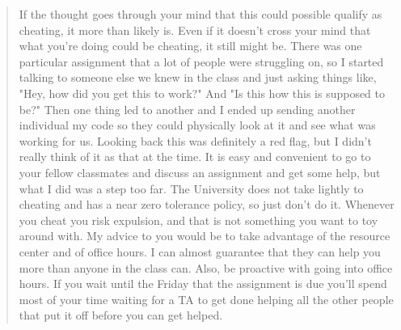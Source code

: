 \documentclass[12pt]{scrartcl}
\begin{document}
\begin{quote}
If the thought goes through your mind that this could possible qualify as
cheating, it more than likely is. Even if it doesn't cross your mind that
what you're doing could be cheating, it still might be. There was one
particular assignment that a lot of people were struggling on, so I started
talking to someone else we knew in the class and just asking things like,
"Hey, how did you get this to work?" And "Is this how this is supposed to
be?" Then one thing led to another and I ended up sending another individual
my code so they could physically look at it and see what was working for us.
Looking back this was definitely a red flag, but I didn't really think of
it as that at the time. It is easy and convenient to go to your fellow
classmates and discuss an assignment and get some help, but what I did
was a step too far. The University does not take lightly to cheating and
has a near zero tolerance policy, so just don't do it. Whenever you cheat
you risk expulsion, and that is not something you want to toy around with.
My advice to you would be to take advantage of the resource center and of
office hours. I can almost guarantee that they can help you more than anyone
in the class can. Also, be proactive with going into office hours. If you
wait until the Friday that the assignment is due you'll spend most of your
time waiting for a TA to get done helping all the other people that put it
off before you can get helped.
\end{quote}
\end{document}
